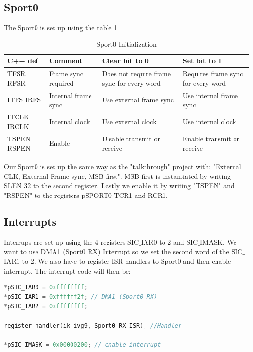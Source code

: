 \subsection{Sport0}
The Sport0 is set up using the table \ref{table:Sport0}
\begin{table}[htbp]
    \begin{tabular}{| p{1.5cm} | l | p{4.5cm} | p{4.5cm} |}
    \hline
    C++ def      & Comment                   & Clear bit to 0                                   & Set bit to 1                             \\ \hline
    TFSR RFSR   & Frame sync required 		 & Does not require frame sync for every word & Requires frame  					sync for every word \\ \hline
    ITFS IRFS   & Internal frame  					sync & Use external  					frame sync                    & Use internal  					frame sync            \\ \hline
    ITCLK IRCLK & Internal clock            & Use external  					clock                         & Use internal  					clock                 \\ \hline
    TSPEN RSPEN & Enable                    & Disable transmit  					or receive                & Enable transmit  					or receive         \\ \hline
    \end{tabular}
    \caption{Sport0 Initialization}
    \label{table:Sport0}
\end{table}
Our Sport0 is set up the same way as the "talkthrough" project with: "External CLK, External Frame sync, MSB first". MSB first is instantiated by writing SLEN$\_$32 to the second register. Lastly we enable it by writing "TSPEN" and "RSPEN" to the registers pSPORT0 TCR1 and RCR1.
\subsection{Interrupts}
Interrups are set up using the 4 registers SIC$\_$IAR0 to 2 and SIC$\_$IMASK. We want to use DMA1 (Sport0 RX) Interrupt so we set the second word of the SIC$\_$IAR1 to 2. We also have to register ISR handlers to Sport0 and then enable interrupt. The interrupt code will then be:
\begin{lstlisting}[language=C]
*pSIC_IAR0 = 0xffffffff;
*pSIC_IAR1 = 0xffffff2f; // DMA1 (Sport0 RX)
*pSIC_IAR2 = 0xffffffff;

register_handler(ik_ivg9, Sport0_RX_ISR); //Handler

*pSIC_IMASK = 0x00000200; // enable interrupt
\end{lstlisting}

